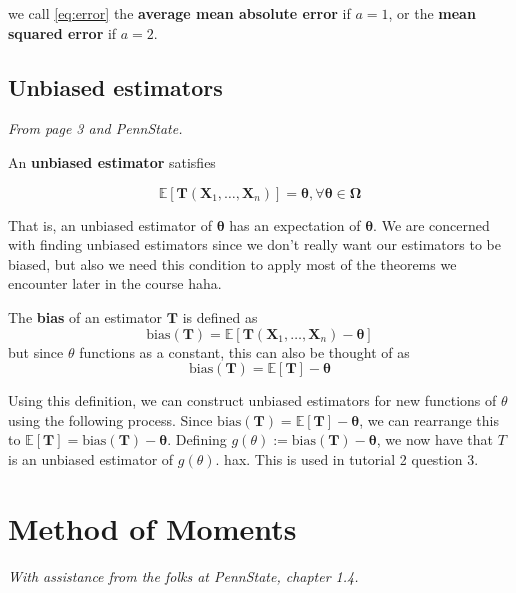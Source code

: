 we call \cref{eq:error} the \textbf{average mean absolute error} if \(a = 1\), or the \textbf{mean squared error} if \(a=2\).

\subsection{Unbiased estimators}\label{sec:unbiased ests}

\textit{From page 3 and PennState. \autocite{penn415}}

An \textbf{unbiased estimator} satisfies 

\begin{equation}\label{eq:unbiased cond}
    \mathbb{E}[\bm{T}(\bm{X}_1, \ldots, \bm{X}_n)] = \bm{\theta}, \forall \bm{\theta}\in\bm{\Omega}
\end{equation}

That is, an unbiased estimator of \(\bm{\theta}\) has an expectation of \(\bm{\theta}\). 
We are concerned with finding unbiased estimators since we don't really want our estimators to be biased, but also we
need this condition to apply most of the theorems we encounter later in the course haha.

\begin{definition}\label{defn:bias}
    The \textbf{bias} of an estimator \(\bm{T}\) is defined as
    \begin{equation}\label{eq:bias}
        \text{bias}(\bm{T}) = \mathbb{E}[\bm{T}(\bm{X}_1, \ldots, \bm{X}_n) - \bm{\theta}]
    \end{equation}
    but since \(\theta\) functions as a constant, this can also be thought of as 
    \[\text{bias}(\bm{T}) = \mathbb{E}[\bm{T}] - \bm{\theta}\]
\end{definition}

Using this definition, we can construct unbiased estimators for new functions of \(\theta\) using the following process. 
Since \(\text{bias}(\bm{T}) = \mathbb{E}[\bm{T}] - \bm{\theta}\), we can rearrange this to \(\mathbb{E}[\bm{T}] = \text{bias}(\bm{T}) - \bm{\theta}\). 
Defining \(g(\theta):= \text{bias}(\bm{T}) - \bm{\theta}\), we now have that \(T\) is an unbiased estimator of \(g(\theta)\). 
hax. This is used in tutorial 2 question 3.

\section{Method of Moments}\label{sec:method of moments}

\textit{With assistance from the folks at PennState, chapter 1.4.\autocite{penn415}}


